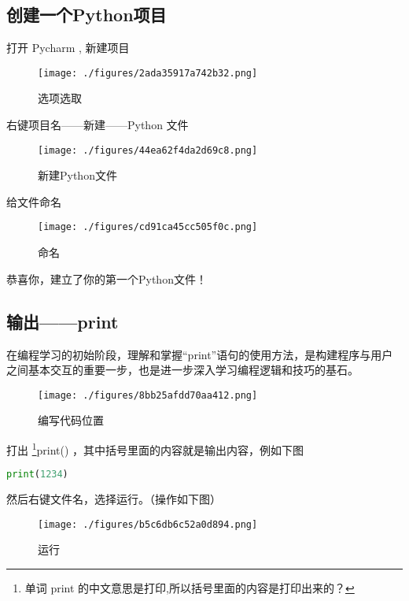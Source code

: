 

\subsection{创建一个Python项目}

打开 Pycharm , 新建项目

\begin{figure}[ht]
\centering
\texttt{[image: ./figures/2ada35917a742b32.png]}
\caption{选项选取} \label{fig_Pyc2_2}
\end{figure}

右键项目名——新建——Python 文件

\begin{figure}[ht]
\centering
\texttt{[image: ./figures/44ea62f4da2d69c8.png]}
\caption{新建Python文件} \label{fig_Pyc2_1}
\end{figure}

给文件命名

\begin{figure}[ht]
\centering
\texttt{[image: ./figures/cd91ca45cc505f0c.png]}
\caption{命名} \label{fig_Pyc2_3}
\end{figure}

恭喜你，建立了你的第一个Python文件！

\subsection{输出——print}

在编程学习的初始阶段，理解和掌握“print”语句的使用方法，是构建程序与用户之间基本交互的重要一步，也是进一步深入学习编程逻辑和技巧的基石。

\begin{figure}[ht]
\centering
\texttt{[image: ./figures/8bb25afdd70aa412.png]}
\caption{编写代码位置} \label{fig_Pyc2_4}
\end{figure}

打出 \footnote{单词 print 的中文意思是打印,所以括号里面的内容是打印出来的？}print() ，其中括号里面的内容就是输出内容，例如下图

\begin{lstlisting}[language=python]
print(1234)
\end{lstlisting}

然后右键文件名，选择运行。（操作如下图）

\begin{figure}[ht]
\centering
\texttt{[image: ./figures/b5c6db6c52a0d894.png]}
\caption{运行} \label{fig_Pyc2_5}
\end{figure}

